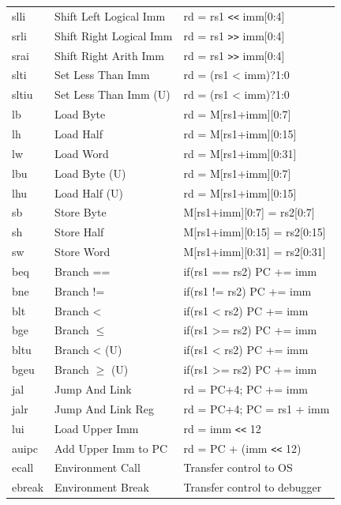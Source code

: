 \begin{multicols}{2}
\begin{tabular}
        \end{tabular}
        \begin{tabular}
        {| T | l | l |} \hline
        slli     & Shift Left Logical Imm  & rd = rs1 \verb|<<| imm[0:4]  \\
        srli     & Shift Right Logical Imm & rd = rs1 \verb|>>| imm[0:4]  \\
        srai     & Shift Right Arith Imm   & rd = rs1 \verb|>>| imm[0:4]  \\
        slti     & Set Less Than Imm       & rd = (rs1 < imm)?1:0         \\
        sltiu    & Set Less Than Imm (U)   & rd = (rs1 < imm)?1:0         \\ \hline
        lb       & Load Byte               & rd = M[rs1+imm][0:7]         \\
        lh       & Load Half               & rd = M[rs1+imm][0:15]        \\
        lw       & Load Word               & rd = M[rs1+imm][0:31]        \\
        lbu      & Load Byte (U)           & rd = M[rs1+imm][0:7]         \\
        lhu      & Load Half (U)           & rd = M[rs1+imm][0:15]        \\ \hline
        sb       & Store Byte              & M[rs1+imm][0:7]  = rs2[0:7]  \\
        sh       & Store Half              & M[rs1+imm][0:15] = rs2[0:15] \\
        sw       & Store Word              & M[rs1+imm][0:31] = rs2[0:31] \\ \hline
        beq      & Branch ==               & if(rs1 == rs2) PC += imm     \\
        bne      & Branch !=               & if(rs1 != rs2) PC += imm     \\
        blt      & Branch <                & if(rs1 < \enspace rs2) PC += imm \\
        bge      & Branch $\leq$           & if(rs1 >= rs2) PC += imm     \\
        bltu     & Branch < (U)            & if(rs1 < \enspace rs2) PC += imm \\
        bgeu     & Branch $\geq$ (U)       & if(rs1 >= rs2) PC += imm     \\ \hline
        jal      & Jump And Link           & rd = PC+4; PC += imm         \\
        jalr     & Jump And Link Reg       & rd = PC+4; PC = rs1 + imm    \\ \hline
        lui      & Load Upper Imm          & rd = imm \verb|<<| 12        \\
        auipc    & Add Upper Imm to PC     & rd = PC + (imm \verb|<<| 12) \\ \hline
        ecall    & Environment Call        & Transfer control to OS       \\ \hline
        ebreak   & Environment Break       & Transfer control to debugger \\ \hline
        \end{tabular}


\end{multicols}
